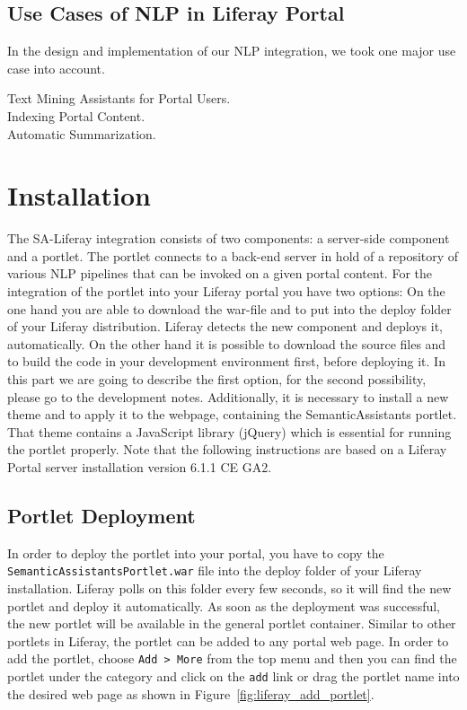 \subsection{Use Cases of NLP in Liferay Portal}
In the design and implementation of our NLP integration, we took one major use case into account.

\begin{description}
\item[Text Mining Assistants for Portal Users.] 
\item[Indexing Portal Content.] 
\item[Automatic Summarization.]
\end{description}

\noindent

\section{Installation}
The SA-Liferay integration consists of two components: a server-side component and a portlet. The portlet connects to a back-end \sa server in hold of a repository of various NLP pipelines that can be invoked on a given portal content. For the integration of the \sa portlet into your Liferay portal you have two options: On the one hand you are able to download the war-file and to put into the deploy folder of your Liferay distribution. Liferay detects the new component and deploys it, automatically. On the other hand it is possible to download the source files and to build the code in your development environment first, before deploying it. In this part we are going to describe the first option, for the second possibility, please go to the development notes. Additionally, it is necessary to install a new theme and to apply it to the webpage, containing the SemanticAssistants portlet. That theme contains a JavaScript library (jQuery) which is essential for running the \sa portlet properly. Note that the following instructions are based on a Liferay Portal server installation version 6.1.1 CE GA2. 

\subsection{\sa Portlet Deployment}
In order to deploy the \sa portlet into your portal, you have to copy the \texttt{SemanticAssistantsPortlet.war} file into the deploy folder of your Liferay installation. Liferay polls on this folder every few seconds, so it will find the new portlet and deploy it automatically. As soon as the deployment was successful, the new portlet will be available in the general portlet container. Similar to other portlets in Liferay, the \sa portlet can be added to any portal web page. In order to add the \sa portlet, choose \texttt{Add \textgreater~More} from the top menu and then you can find the portlet under the \sa category and click on the \texttt{add} link or drag the portlet name into the desired web page as shown in Figure~\ref{fig:liferay_add_portlet}.

